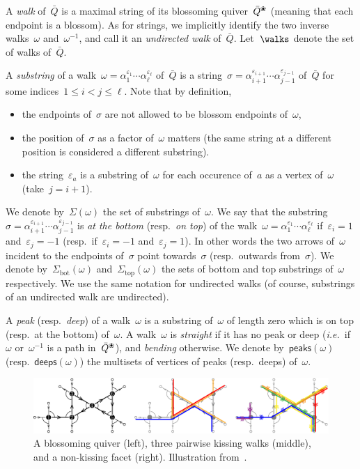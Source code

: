 \documentclass{amsart}
\theoremstyle{definition}
\newcommand{\ie}{\textit{i.e.}~} %
\newcommand{\darkblue}{\color{darkblue}} %
\newcommand{\defn}[1]{\textsl{\darkblue #1}} %
\newcommand{\quiver}{\bar Q} %
\newcommand{\blossom}{^\text{\ding{96}}} %
\renewcommand{\top}{\mathrm{top}} %
\newcommand{\bottom}{\mathrm{bot}} %
\newcommand{\peaks}[1]{\mathsf{peaks}(#1)} %
\newcommand{\deeps}[1]{\mathsf{deeps}(#1)} %
\begin{document}
A \defn{walk} of~$\quiver$ is a maximal string of its blossoming quiver~$\quiver\blossom$ (meaning that each endpoint is a blossom).
As for strings, we implicitly identify the two inverse walks~$\omega$ and~$\omega^{-1}$, and call it an \defn{undirected walk} of~$\quiver$.
Let~$\walks$ denote the set of walks of~$\quiver$.

A \defn{substring} of a walk~$\omega = \alpha_1^{\varepsilon_1} \cdots \alpha_\ell^{\varepsilon_\ell}$ of~$\quiver$ is a string~$\sigma = \alpha_{i+1}^{\varepsilon_{i+1}} \cdots \alpha_{j-1}^{\varepsilon_{j-1}}$ of~$\quiver$ for some indices~$1 \le i < j \le \ell$. Note that by definition,
\begin{itemize}
\item the endpoints of~$\sigma$ are not allowed to be blossom endpoints of~$\omega$,
\item the position of~$\sigma$ as a factor of~$\omega$ matters (the same string at a different position is considered a different substring).
\item the string~$\varepsilon_a$ is a substring of~$\omega$ for each occurence of~$a$ as a vertex of~$\omega$ (take~$j = i+1$).
\end{itemize}
We denote by~$\Sigma(\omega)$ the set of substrings of~$\omega$.
We say that the substring~$\sigma = \alpha_{i+1}^{\varepsilon_{i+1}} \cdots \alpha_{j-1}^{\varepsilon_{j-1}}$ is \defn{at the bottom} (resp.~\defn{on top}) of the walk~$\omega = \alpha_1^{\varepsilon_1} \cdots \alpha_\ell^{\varepsilon_\ell}$ if~$\varepsilon_i = 1$ and~$\varepsilon_j = -1$ (resp.~if~$\varepsilon_i = -1$ and~$\varepsilon_j = 1$).
In other words the two arrows of~$\omega$ incident to the endpoints of~$\sigma$ point towards~$\sigma$ (resp.~outwards from~$\sigma$).
We denote by~$\Sigma_\bottom(\omega)$ and~$\Sigma_\top(\omega)$ the sets of bottom and top substrings of~$\omega$ respectively.
We use the same notation for undirected walks (of course, substrings of an undirected walk are undirected).

A \defn{peak} (resp.~\defn{deep}) of a walk~$\omega$ is a substring of~$\omega$ of length zero which is on top (resp.~at the bottom) of~$\omega$.
A walk~$\omega$ is \defn{straight} if it has no peak or deep (\ie if~$\omega$ or~$\omega^{-1}$ is a path in~$\quiver\blossom$), and \defn{bending} otherwise.
We denote by~$\peaks{\omega}$ (resp.~$\deeps{\omega}$) the multisets of vertices of peaks (resp.~deeps) of~$\omega$.

\begin{figure}[t]
	\capstart
	\centerline{\includegraphics[width=\textwidth]{exmNonkissing}}
	\caption{A blossoming quiver (left), three pairwise kissing walks (middle), and a non-kissing facet (right). Illustration from~\cite{PaluPilaudPlamondon-nonkissing}.}
	\label{fig:exmNonkissing}
\end{figure}
\end{document}
